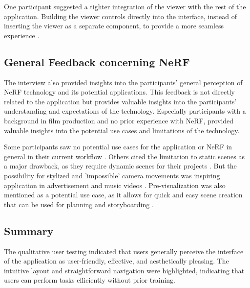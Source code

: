 One participant suggested a tighter integration of the viewer with the rest of the application.
Building the viewer controls directly into the interface, instead of inserting the viewer as a separate component, to provide a more seamless experience \cite{P9}.

\subsection*{General Feedback concerning NeRF}

The interview also provided insights into the participants' general perception of NeRF technology and its potential applications.
This feedback is not directly related to the application but provides valuable insights into the participants' understanding and expectations of the technology.
Especially participants with a background in film production and no prior experience with NeRF, provided valuable insights into the potential use cases and limitations of the technology.

Some participants saw no potential use cases for the application or NeRF in general in their current workflow \cite{P3}. 
Others cited the limitation to static scenes as a major drawback, as they require dynamic scenes for their projects \cite{P4, P5}. 
But the possibility for stylized and 'impossible' camera movements was inspiring application in advertisement and music videos \cite{P4}. 
Pre-visualization was also mentioned as a potential use case, as it allows for quick and easy scene creation that can be used for planning and storyboarding \cite{P4}. 


\subsection*{Summary}
\label{sec:result:qualitative_summary}

The qualitative user testing indicated that users generally perceive the interface of the application as user-friendly, effective, and aesthetically pleasing.
The intuitive layout and straightforward navigation were highlighted, indicating that users can perform tasks efficiently without prior training.

